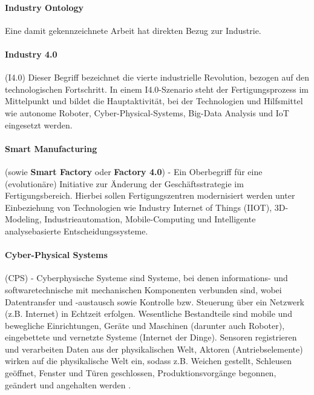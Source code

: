 \documentclass{article}
\begin{document}
\paragraph{Industry Ontology} Eine damit gekennzeichnete Arbeit hat direkten Bezug zur Industrie.

\paragraph{Industry 4.0} (I4.0) Dieser Begriff bezeichnet die vierte industrielle Revolution, bezogen auf den technologischen Fortschritt. In einem I4.0-Szenario steht der Fertigungsprozess im Mittelpunkt und bildet die Hauptaktivität, bei der Technologien und Hilfsmittel wie autonome Roboter, Cyber-Physical-Systems, Big-Data Analysis und IoT eingesetzt werden.

\paragraph{Smart Manufacturing} (sowie \textbf{Smart Factory} oder \textbf{Factory 4.0}) - Ein Oberbegriff für eine (evolutionäre) Initiative zur Änderung der Geschäftsstrategie im Fertigungsbereich. Hierbei sollen Fertigungszentren modernisiert werden unter Einbeziehung von Technologien wie Industry Internet of Things (IIOT), 3D-Modeling, Industrieautomation, Mobile-Computing und Intelligente analysebasierte Entscheidungssysteme.

\paragraph{Cyber-Physical Systems} (CPS) - Cyberphysische Systeme sind Systeme, bei denen informations- und softwaretechnische mit mechanischen Komponenten verbunden sind, wobei Datentransfer und -austausch sowie Kontrolle bzw. Steuerung über ein Netzwerk (z.B. Internet) in Echtzeit erfolgen. Wesentliche Bestandteile sind mobile und bewegliche Einrichtungen, Geräte und Maschinen (darunter auch Roboter), eingebettete und vernetzte Systeme (Internet der Dinge). Sensoren registrieren und verarbeiten Daten aus der physikalischen Welt, Aktoren (Antriebselemente) wirken auf die physikalische Welt ein, sodass z.B. Weichen gestellt, Schleusen geöffnet, Fenster und Türen geschlossen, Produktionsvorgänge begonnen, geändert und angehalten werden \cite{GablerCPS2024}.
\end{document}
